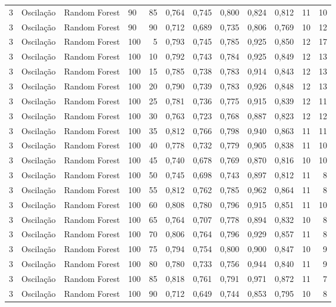 \begin{longtable}{ccclrrrrrrrr}
3 & Oscilação & Random Forest & 90 & 85 & 0,764 & 0,745 & 0,800 & 0,824 & 0,812 & 11 & 10 \\
3 & Oscilação & Random Forest & 90 & 90 & 0,712 & 0,689 & 0,735 & 0,806 & 0,769 & 10 & 12 \\
3 & Oscilação & Random Forest & 100 & 5 & 0,793 & 0,745 & 0,785 & 0,925 & 0,850 & 12 & 17 \\
3 & Oscilação & Random Forest & 100 & 10 & 0,792 & 0,743 & 0,784 & 0,925 & 0,849 & 12 & 13 \\
3 & Oscilação & Random Forest & 100 & 15 & 0,785 & 0,738 & 0,783 & 0,914 & 0,843 & 12 & 13 \\
3 & Oscilação & Random Forest & 100 & 20 & 0,790 & 0,739 & 0,783 & 0,926 & 0,848 & 12 & 13 \\
3 & Oscilação & Random Forest & 100 & 25 & 0,781 & 0,736 & 0,775 & 0,915 & 0,839 & 12 & 11 \\
3 & Oscilação & Random Forest & 100 & 30 & 0,763 & 0,723 & 0,768 & 0,887 & 0,823 & 12 & 12 \\
3 & Oscilação & Random Forest & 100 & 35 & 0,812 & 0,766 & 0,798 & 0,940 & 0,863 & 11 & 11 \\
3 & Oscilação & Random Forest & 100 & 40 & 0,778 & 0,732 & 0,779 & 0,905 & 0,838 & 11 & 10 \\
3 & Oscilação & Random Forest & 100 & 45 & 0,740 & 0,678 & 0,769 & 0,870 & 0,816 & 10 & 10 \\
3 & Oscilação & Random Forest & 100 & 50 & 0,745 & 0,698 & 0,743 & 0,897 & 0,812 & 11 & 8 \\
3 & Oscilação & Random Forest & 100 & 55 & 0,812 & 0,762 & 0,785 & 0,962 & 0,864 & 11 & 8 \\
3 & Oscilação & Random Forest & 100 & 60 & 0,808 & 0,780 & 0,796 & 0,915 & 0,851 & 11 & 10 \\
3 & Oscilação & Random Forest & 100 & 65 & 0,764 & 0,707 & 0,778 & 0,894 & 0,832 & 10 & 8 \\
3 & Oscilação & Random Forest & 100 & 70 & 0,806 & 0,764 & 0,796 & 0,929 & 0,857 & 11 & 8 \\
3 & Oscilação & Random Forest & 100 & 75 & 0,794 & 0,754 & 0,800 & 0,900 & 0,847 & 10 & 9 \\
3 & Oscilação & Random Forest & 100 & 80 & 0,780 & 0,733 & 0,756 & 0,944 & 0,840 & 11 & 9 \\
3 & Oscilação & Random Forest & 100 & 85 & 0,818 & 0,761 & 0,791 & 0,971 & 0,872 & 11 & 7 \\
3 & Oscilação & Random Forest & 100 & 90 & 0,712 & 0,649 & 0,744 & 0,853 & 0,795 & 10 & 8 \\

\end{longtable}
